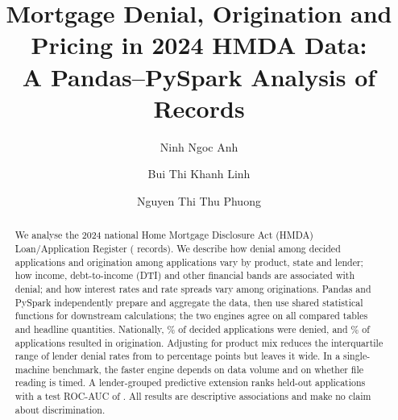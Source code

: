 \documentclass[acmtog,nonacm]{acmart}
\begin{document}
\title{Mortgage Denial, Origination and Pricing in 2024 HMDA Data:\\
A Pandas--PySpark Analysis of \NRecords{} Records}

\author{Ninh Ngoc Anh}
\author{Bui Thi Khanh Linh}
\author{Nguyen Thi Thu Phuong}

\begin{abstract}
We analyse the 2024 national Home Mortgage Disclosure Act (HMDA) Loan/Application Register (\NRecords{} records). We describe how denial among decided applications and origination among applications vary by product, state and lender; how income, debt-to-income (DTI) and other financial bands are associated with denial; and how interest rates and rate spreads vary among originations. Pandas and PySpark independently prepare and aggregate the data, then use shared statistical functions for downstream calculations; the two engines agree on all \NTables{} compared tables and \NHeadline{} headline quantities. Nationally, \DenialPct\% of \NDecided{} decided applications were denied, and \OrigPct\% of applications resulted in origination. Adjusting for product mix reduces the interquartile range of lender denial rates from \RawIQR{} to \StdIQR{} percentage points but leaves it wide. In a single-machine benchmark, the faster engine depends on data volume and on whether file reading is timed. A lender-grouped predictive extension ranks held-out applications with a test ROC-AUC of \GBAUC{}. All results are descriptive associations and make no claim about discrimination.
\end{abstract}

\maketitle

\end{document}
